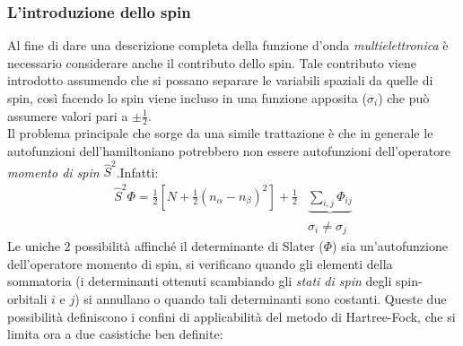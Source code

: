 \documentclass[oneside]{amsbook}
\numberwithin{section}{chapter}
\numberwithin{equation}{section}
\numberwithin{figure}{section}
\begin{document}
\subsubsection{L'introduzione dello spin} Al fine di dare una descrizione completa della funzione d'onda \emph{multielettronica} è necessario considerare anche il contributo dello spin. 
Tale contributo viene introdotto assumendo che si possano separare le variabili spaziali da quelle di spin, così facendo lo spin viene incluso in una funzione apposita ($\sigma_i$) che può assumere valori pari a $\pm\frac{1}{2}$. \\
Il problema principale che sorge da una simile trattazione è che in generale le autofunzioni dell'hamiltoniano potrebbero non essere autofunzioni dell'operatore \emph{momento di spin} $\hat{S}^2$.Infatti:
\begin{equation}
\begin{aligned}
\hat{S}^2 \Phi = \frac{1}{2}\left[ N+\frac{1}{2}(n_{\alpha}-n_{\beta})^2 \right]+\frac{1}{2}&\underbrace{\sum \limits_{i,j}\Phi_{ij}} \\
& \sigma_i\neq\sigma_j
\end{aligned}
\end{equation}
Le uniche $2$ possibilità affinché il determinante di Slater ($\Phi$) sia un'autofunzione dell'operatore momento di spin, si verificano quando gli elementi della sommatoria (i determinanti ottenuti scambiando gli \emph{stati di spin} degli spin-orbitali $i$ e $j$) si annullano o quando tali determinanti sono costanti. Queste due possibilità definiscono i confini di applicabilità del metodo di Hartree-Fock, che si limita ora a due casistiche ben definite:
\end{document}
